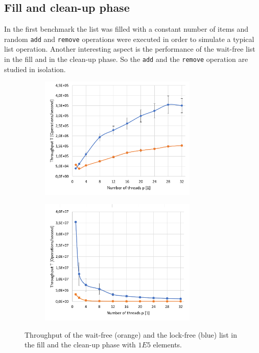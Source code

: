 \documentclass[a4paper, 12pt]{article}
\begin{document}
\subsection{Fill and clean-up phase}
In the first benchmark the list was filled with a constant number of items and random \verb|add| and \verb|remove| operations were executed in order to simulate a typical list operation. Another interesting aspect is the performance of the wait-free list in the fill and in the clean-up phase. So the \verb|add| and the \verb|remove| operation are studied in isolation.


\begin{figure} [h!]
\begin{subfigure}[c]{0.45\textwidth}
\includegraphics[width=7.5cm]{tp_fill.png}
\centering
{}
\end{subfigure}
\begin{subfigure}[c]{0.45\textwidth}
\includegraphics[width=7.5cm]{tp_cleanup.png}
\centering
{}
\end{subfigure}
\caption{Throughput of the wait-free (orange) and the lock-free (blue) list in the fill and the clean-up phase with $1E5$ elements.}
\label{tp}
\end{figure}

\end{document}
